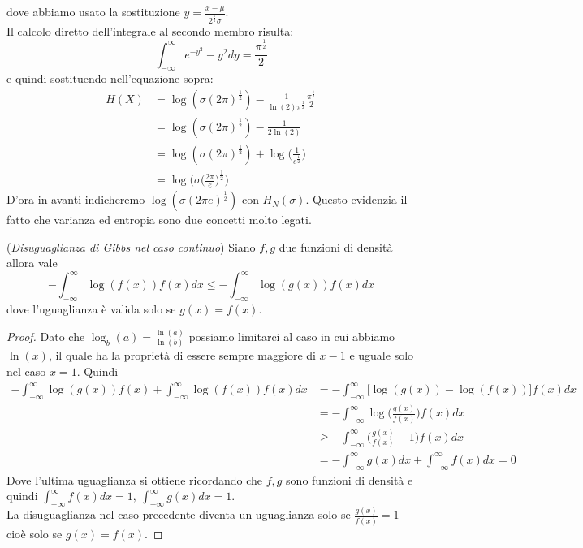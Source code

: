 dove abbiamo usato la sostituzione $y=\frac{x-\mu}{2^{\frac{1}{2}}\sigma}$.\\
Il calcolo diretto dell'integrale al secondo membro risulta:
$$\int_{-\infty}^{\infty} e^{-y^2}-y^2 dy= \frac{\pi^{\frac{1}{2}}}{2}$$
e quindi sostituendo nell'equazione sopra:
\begin{equation}
\begin{split}
H(X)&=\log (\sigma (2\pi)^{\frac{1}{2}})-\frac{1}{\ln(2) \pi^{\frac{1}{2}}}\frac{\pi^{\frac{1}{2}}}{2}\\
&=\log (\sigma (2\pi)^{\frac{1}{2}})-\frac{1}{2 \ln(2)} \\
&=\log (\sigma (2\pi)^{\frac{1}{2}})+ \log \bigg(\frac{1}{e^{\frac{1}{2}}} \bigg) \\
&=\log \bigg( \sigma \bigg(\frac{2\pi}{e} \bigg)^{\frac{1}{2}} \bigg)
\end{split}
\end{equation}
D'ora in avanti indicheremo $\log(\sigma(2\pi e)^{\frac{1}{2}})$ con $H_N(\sigma)$. Questo evidenzia il fatto che varianza ed entropia sono due concetti molto legati.

\begin{teo}\label{teo:GibbsContinuo}(\textit{Disuguaglianza di Gibbs nel caso continuo})
Siano $f,g$ due funzioni di densità allora vale
\begin{equation}
-\int_{-\infty}^{\infty} \log(f(x))f(x)dx \leq - \int_{-\infty}^{\infty} \log(g(x))f(x)dx
\end{equation}
dove l'uguaglianza è valida solo se $g(x)=f(x)$.
\end{teo}
\begin{proof}
Dato che $\log_b(a)=\frac{\ln (a)}{\ln (b)}$ possiamo limitarci al caso in cui abbiamo $\ln(x)$, il quale ha la proprietà di essere sempre maggiore di $x-1$ e uguale solo nel caso $x=1$. Quindi
\[
\begin{split}
- \int_{-\infty}^{\infty} \log(g(x))f(x) +  \int_{-\infty}^{\infty} \log(f(x))f(x)dx & = - \int_{-\infty}^{\infty} \bigg[\log(g(x))-\log(f(x))\bigg] f(x)dx \\
& =-\int_{-\infty}^{\infty} \log \bigg(\frac{g(x)}{f(x)}\bigg)f(x)dx\\
& \geq  -\int_{-\infty}^{\infty} \bigg(\frac{g(x)}{f(x)} -1\bigg)f(x)dx\\
&= -\int_{-\infty}^{\infty} g(x)dx +\int_{-\infty}^{\infty} f(x)dx=0
\end{split}
\]
Dove l'ultima uguaglianza si ottiene ricordando che $f,g$ sono funzioni di densità e quindi $\int_{-\infty}^{\infty} f(x)dx=1, \ \int_{-\infty}^{\infty} g(x)dx=1$.\\
La disuguaglianza nel caso precedente diventa un uguaglianza solo se $\frac{g(x)}{f(x)}=1$ cioè solo se $g(x)=f(x)$.
\end{proof}


